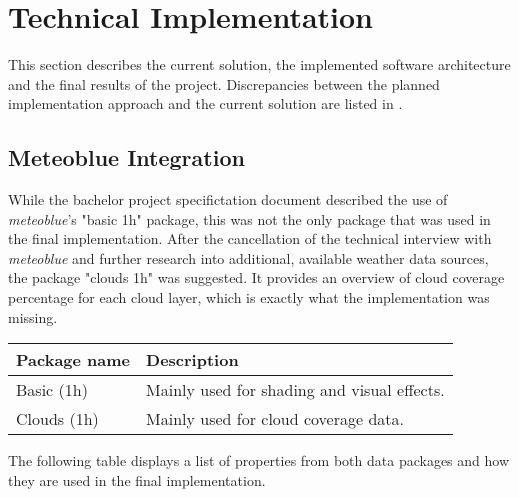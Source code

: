 \section{Technical Implementation}
\label{section:techimpl}
This section describes the current solution, the implemented software architecture and the final results of the project.
Discrepancies between the planned implementation approach and the current solution are listed in .

\subsection{Meteoblue Integration}
\label{section:techimpl:meteoblue}
While the bachelor project specifictation document described the use of \emph{meteoblue}'s "basic 1h" package, this was not the only package that was used in the final implementation.
After the cancellation of the technical interview with \emph{meteoblue} and further research into additional, available weather data sources, the package "clouds 1h" was suggested.
It provides an overview of cloud coverage percentage for each cloud layer, which is exactly what the implementation was missing.
\emptyline
\begin{tabularx}{\linewidth}{|l|X|}
    \hline
    \textbf{Package name}   & \textbf{Description} \\ \hline
    Basic (1h)              & Mainly used for shading and visual effects. \\ \hline
    Clouds (1h)             & Mainly used for cloud coverage data. \\ \hline
\end{tabularx}
\emptyline
The following table displays a list of properties from both data packages and how they are used in the final implementation.
\emptyline
